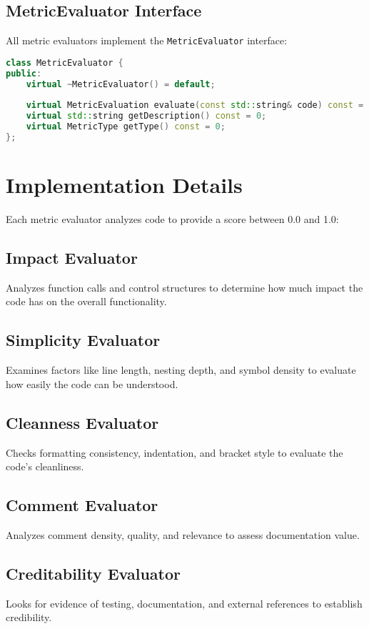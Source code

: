 \documentclass[11pt,a4paper]{report}
\begin{document}
\subsection{MetricEvaluator Interface}
All metric evaluators implement the \texttt{MetricEvaluator} interface:

\begin{lstlisting}[language=C++]
class MetricEvaluator {
public:
    virtual ~MetricEvaluator() = default;
    
    virtual MetricEvaluation evaluate(const std::string& code) const = 0;
    virtual std::string getDescription() const = 0;
    virtual MetricType getType() const = 0;
};
\end{lstlisting}

\section{Implementation Details}
Each metric evaluator analyzes code to provide a score between 0.0 and 1.0:

\subsection{Impact Evaluator}
Analyzes function calls and control structures to determine how much impact the code has on the overall functionality.

\subsection{Simplicity Evaluator}
Examines factors like line length, nesting depth, and symbol density to evaluate how easily the code can be understood.

\subsection{Cleanness Evaluator}
Checks formatting consistency, indentation, and bracket style to evaluate the code's cleanliness.

\subsection{Comment Evaluator}
Analyzes comment density, quality, and relevance to assess documentation value.

\subsection{Creditability Evaluator}
Looks for evidence of testing, documentation, and external references to establish credibility.
\end{document}
